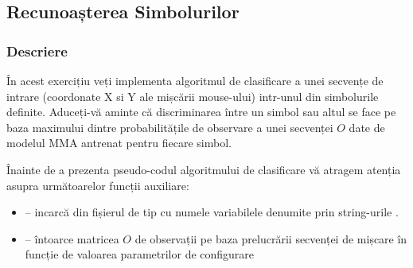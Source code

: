 \documentclass[12pt]{article}
\begin{document}
\subsection{Recunoașterea Simbolurilor}
\label{sec:symbol-recognition}


\subsubsection{Descriere}
În acest exercițiu veți implementa algoritmul de clasificare a unei secvențe de intrare (coordonate X si Y ale mișcării mouse-ului) intr-unul din simbolurile definite.
Aduceți-vă aminte că discriminarea între un simbol sau altul se face pe baza maximului dintre probabilitățile de observare a unei secvenței $O$ date de modelul MMA antrenat pentru fiecare simbol.

Înainte de a prezenta pseudo-codul algoritmului de clasificare vă atragem atenția asupra următoarelor funcții auxiliare:
\\%
\begin{itemize}
	\item {} -- incarcă din fișierul de tip  cu
	 numele  variabilele denumite prin string-urile .
	\item {} -- întoarce matricea $O$ de observații pe baza prelucrării secvenței
	de mișcare  în funcție de valoarea parametrilor de configurare 
\end{itemize}
\end{document}
